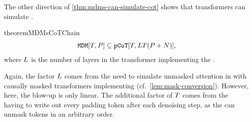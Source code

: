 \documentclass{article} %
\begin{document}
The other direction of \cref{thm:mdms-can-simulate-cot} shows that \pCoTAcr transformers can simulate \eMDMsAcr .
\begin{restatable}{theorem}{MDMsCoTChain} \label{thm:cot-can-simulate-mdms}
   \begin{equation}
      {\mathtt{MDM}}[{T}, {P}] \subseteq {\mathtt{pCoT}}[{T}, {{L}} {T} ({P} + {{N}})], 
   \end{equation}
   where ${{L}}$ is the number of layers in the transformer implementing the \eMDMAcr.
\end{restatable}
Again, the factor ${{L}}$ comes from the need to simulate unmasked attention in \MDMsAcr with causally masked transformers implementing \pCoTAcr (cf.~\cref{lem:mask-conversion}).
However, here, the blow-up is only linear.
The additional factor of ${T}$ comes from the \pCoTAcr having to write out every padding token after each denoising step, as the \MDMAcr can unmask tokens in an arbitrary order.
\end{document}
